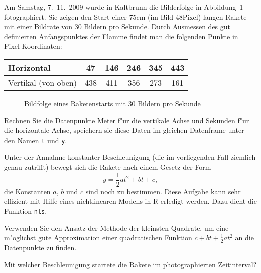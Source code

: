 Am Samstag, 7.~11.~2009 wurde in Kaltbrunn die
Bilderfolge in Abbildung~1 fotographiert. Sie zeigen den Start
einer 75cm (im Bild 48Pixel) langen Rakete mit einer Bildrate von
30 Bildern pro Sekunde.
Durch Ausmessen des gut definierten Anfangspunktes der Flamme findet
man die folgenden Punkte in Pixel-Koordinaten:
\begin{center}
\begin{tabular}{l|ccccc}
Horizontal&47&146&246&345&443\\
\hline
Vertikal (von oben)&438&411&356&273&161
\end{tabular}
\end{center}
\begin{figure}
\begin{center}
\end{center}
\caption{Bildfolge eines Raketenstarts mit 30 Bildern pro Sekunde}
\end{figure}
\begin{teilaufgaben}
\item Rechnen Sie die Datenpunkte Meter f"ur die vertikale Achse
und Sekunden f"ur die horizontale Achse, speichern sie diese Daten
im gleichen Datenframe unter den Namen {\tt t} und {\tt y}.
\item Unter der Annahme konstanter Beschleunigung (die im vorliegenden Fall
ziemlich genau zutrifft) bewegt sich die Rakete nach einem Gesetz
der Form
\[
y=\frac12at^2+bt+c,
\]
die Konstanten $a$, $b$ und $c$ sind noch zu bestimmen. Diese Aufgabe
kann sehr effizient mit Hilfe eines nichtlinearen Modells in R erledigt
werden. Dazu dient die Funktion {\tt nls}.
\item Verwenden Sie den Ansatz der Methode der kleinsten Quadrate, um
eine m"oglichst gute Approximation einer quadratischen Funktion
$c+bt+\frac12at^2$ an die Datenpunkte zu finden.
\item Mit welcher Beschleunigung startete die Rakete im photographierten
Zeitinterval?
\end{teilaufgaben}


